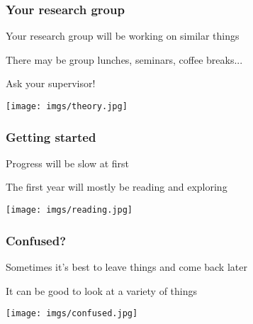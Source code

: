 \begin{frame}
    \frametitle{Your research group}
    \centering
    \begin{minipage}{0.4\textwidth}
        \centering
        \Large

        Your \alert{research group} will be working
        on similar things

        \vspace{1em}

        There may be group lunches, seminars, coffee breaks...

        \vspace{1em}

        Ask your supervisor!

    \end{minipage}
    \qquad
    \begin{minipage}{0.4\textwidth}
        \texttt{[image: imgs/theory.jpg]}
    \end{minipage}
\end{frame}
\begin{frame}
    \frametitle{Getting started}
    \centering
    \begin{minipage}{0.40\textwidth}
        \centering
        \Large

        Progress will be \alert{slow} at first

        \vspace{1em}

        The first year will mostly be \alert{reading} and
        \alert{exploring}

        \vspace{1em}
    \end{minipage}
    \qquad
    \begin{minipage}{0.4\textwidth}
        \texttt{[image: imgs/reading.jpg]}
    \end{minipage}
\end{frame}
\begin{frame}
    \frametitle{Confused?}
    \centering
    \begin{minipage}{0.4\textwidth}
        \centering
        \Large

        Sometimes it's best to leave things and
        \alert{come back later}

        \vspace{1em}

        It can be good to look at a \alert{variety}
        of things

    \end{minipage}
    \qquad
    \begin{minipage}{0.4\textwidth}
        \texttt{[image: imgs/confused.jpg]}
    \end{minipage}
\end{frame}
